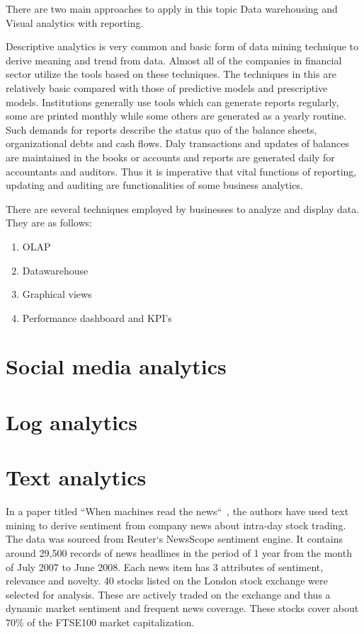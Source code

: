 There are two main approaches to apply in this topic Data warehousing and Visual analytics with reporting.

Descriptive analytics is very common and basic form of data mining technique to derive meaning and trend from data. Almost all of the companies in financial sector utilize the tools based on these techniques. The techniques in this are relatively basic compared with those of predictive models and prescriptive models. Institutions generally use tools which can generate reports regularly, some are printed monthly while some others are generated  as a yearly routine. Such demands for reports describe the status quo of the balance sheets, organizational debts and cash flows. Daly transactions and updates of balances are maintained in the books or accounts and reports are generated daily for accountants and auditors. Thus it is imperative that vital functions of reporting, updating and auditing are functionalities of some business analytics.

There are several techniques employed by businesses to analyze and display data. They are as follows:
\begin{enumerate}
	\item OLAP
	\item Datawarehouse
	\item Graphical views
	\item Performance dashboard and KPI's
\end{enumerate}

\section{Social media analytics}

\section{Log analytics}


\section{Text analytics}
In a paper titled ``When machines read the news``~, the authors have used text mining to derive sentiment from company news about intra-day stock trading. 
The data was sourced from Reuter`s NewsScope sentiment engine. It contains around 29,500 records of news headlines in the period of 1 year from the month of July 2007 to June 2008. Each news item has 3 attributes of sentiment, relevance and novelty. 40 stocks listed on the London stock exchange were selected for analysis. These are actively traded on the exchange and thus a dynamic market sentiment and frequent news coverage. These stocks cover about 70\% of the FTSE100 market capitalization. 


